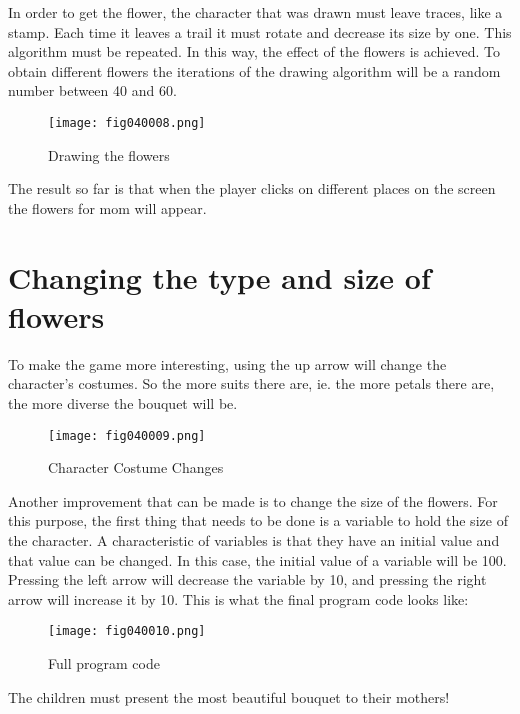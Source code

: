 In order to get the flower, the character that was drawn must leave traces, like a stamp. Each time it leaves a trail it must rotate and decrease its size by one. This algorithm must be repeated. In this way, the effect of the flowers is achieved. To obtain different flowers the iterations of the drawing algorithm will be a random number between 40 and 60.

\begin{figure}[H]
   \centering
   \texttt{[image: fig040008.png]}
   \caption{Drawing the flowers}
\label{fig040008}
\end{figure}

The result so far is that when the player clicks on different places on the screen the flowers for mom will appear.

\section{Changing the type and size of flowers}

To make the game more interesting, using the up arrow will change the character's costumes. So the more suits there are, ie. the more petals there are, the more diverse the bouquet will be.

\begin{figure}[H]
   \centering
   \texttt{[image: fig040009.png]}
   \caption{Character Costume Changes}
\label{fig040009}
\end{figure}

Another improvement that can be made is to change the size of the flowers. For this purpose, the first thing that needs to be done is a variable to hold the size of the character. A characteristic of variables is that they have an initial value and that value can be changed. In this case, the initial value of a variable will be 100. Pressing the left arrow will decrease the variable by 10, and pressing the right arrow will increase it by 10. This is what the final program code looks like:

\begin{figure}[H]
   \centering
   \texttt{[image: fig040010.png]}
   \caption{Full program code}
\label{fig040010}
\end{figure}

The children must present the most beautiful bouquet to their mothers!
